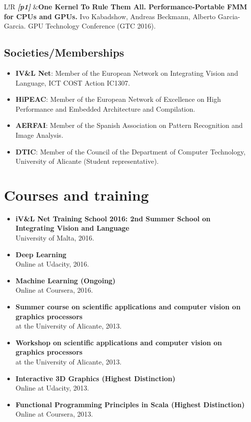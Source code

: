 \documentclass[8pt]{article}
\newcommand\VRule{\color{lightgray}\vrule width 0.5pt}
\begin{document}
\begin{tabular}{L!{\VRule}R}
	\textit{\textbf{[p1]}} &\textbf{One Kernel To Rule Them All. Performance-Portable FMM for CPUs and GPUs.} Ivo Kabadshow, Andreas Beckmann, Alberto Garcia-Garcia. GPU Technology Conference (GTC 2016).\\
\end{tabular}

\subsection*{Societies/Memberships}

\begin{itemize}
	\item \textbf{IV\&L Net}: Member of the European Network on Integrating Vision and Language, ICT COST Action IC1307.
	\item \textbf{HiPEAC}: Member of the European Network of Excellence on High Performance and Embedded Architecture and Compilation.
	\item \textbf{AERFAI}: Member of the Spanish Association on Pattern Recognition and Image Analysis.
	\item \textbf{DTIC}: Member of the Council of the Department of Computer Technology, University of Alicante (Student representative).
\end{itemize}


\section*{Courses and training}

\begin{itemize}
	\item \textbf{iV\&L Net Training School 2016: 2nd Summer School on Integrating Vision and Language}\\ University of Malta, 2016.
	\item \textbf{Deep Learning}\\ Online at Udacity, 2016.
	\item \textbf{Machine Learning (Ongoing)}\\ Online at Coursera, 2016.
	\item \textbf{Summer course on scientific applications and computer vision on graphics processors}\\ at the University of Alicante, 2013.
	\item \textbf{Workshop on scientific applications and computer vision on graphics processors}\\ at the University of Alicante, 2013.	
	\item \textbf{Interactive 3D Graphics (Highest Distinction)}\\
	Online at Udacity, 2013.
	\item \textbf{Functional Programming Principles in Scala (Highest Distinction)}\\
	Online at Coursera, 2013.
\end{itemize}
\end{document}
